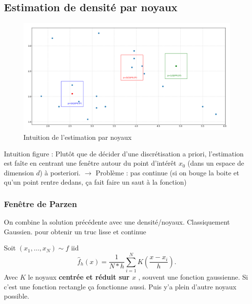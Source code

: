 \documentclass{article}
\begin{document}
\begin{multicols}{2}
\subsection{Estimation de densité par noyaux}
\begin{figure}[htbp]
    \centering
    \includegraphics*[width=\textwidth]{./fig1.png}
    \caption{Intuition de l'estimation par noyaux}
    \label{intuitionnoyaux}
\end{figure}
Intuition figure \cite*{intuitionnoyaux} : Plutôt que de décider d'une discrétisation a priori, l'estimation est faîte en centrant une fenêtre autour du point d'intérêt $ x_0 $ (dans un espace de dimension $d$) à posteriori. $\rightarrow$ Problème : pas continue (si on bouge la boite et qu'un point rentre dedans, ça fait faire un saut à la fonction)

\subsubsection{Fenêtre de Parzen}
On combine la solution précédente avec une densité/noyaux. Classiquement Gaussien. pour obtenir un truc lisse et continue
\begin{defn}
    Soit $ (x_1, \dots, x_N) \sim f $ iid 
    \[
        \hat{f}_h(x) = \frac{1}{N*h} \sum_{i=1}^{N}K (\frac{x - x_i}{h})
    .\]
    Avec $ K $ le noyaux \textbf{centrée et réduit sur $ x $ }, souvent une fonction gaussienne. Si c'est une fonction rectangle ça fonctionne aussi. Puis y'a plein d'autre noyaux possible.
\end{defn}


\end{multicols}
\end{document}
